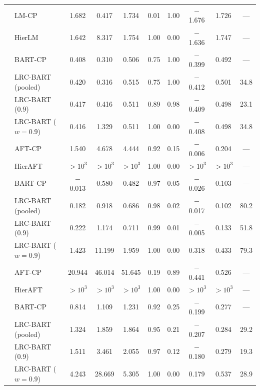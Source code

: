 \documentclass[11pt]{article}
\theoremstyle{definition}
\theoremstyle{plain}
\begin{document}
\begin{longtable}{llcccccccc}
\midrule
{} & LM-CP & 1.682 & 0.417 & 1.734 & 0.01 & 1.00 & $-$1.676 & 1.726 & --- \\*
& HierLM & 1.642 & 8.317 & 1.754 & 1.00 & 0.00 & $-$1.636 & 1.747 & --- \\*
& BART-CP & 0.408 & 0.310 & 0.506 & 0.75 & 1.00 & $-$0.399 & 0.492 & --- \\*
& LRC-BART (pooled) & 0.420 & 0.316 & 0.515 & 0.75 & 1.00 & $-$0.412 & 0.501 & 34.8 \\*
& LRC-BART (0.9) & 0.417 & 0.416 & 0.511 & 0.89 & 0.98 & $-$0.409 & 0.498 & 23.1 \\*
& LRC-BART ($w=0.9$) & 0.416 & 1.329 & 0.511 & 1.00 & 0.00 & $-$0.408 & 0.498 & 34.8 \\
\midrule
{} & AFT-CP & 1.540 & 4.678 & 4.444 & 0.92 & 0.15 & $-$0.006 & 0.204 & --- \\*
& HierAFT & $>\!10^{3}$ & $>\!10^{3}$ & $>\!10^{3}$ & 1.00 & 0.00 & $>\!10^{3}$ & $>\!10^{3}$ & --- \\*
& BART-CP & $-$0.013 & 0.580 & 0.482 & 0.97 & 0.05 & $-$0.026 & 0.103 & --- \\*
& LRC-BART (pooled) & 0.182 & 0.918 & 0.686 & 0.98 & 0.02 & $-$0.017 & 0.102 & 80.2 \\*
& LRC-BART (0.9) & 0.222 & 1.174 & 0.711 & 0.99 & 0.01 & $-$0.005 & 0.133 & 51.8 \\*
& LRC-BART ($w=0.9$) & 1.423 & 11.199 & 1.959 & 1.00 & 0.00 & 0.318 & 0.433 & 79.3 \\
\midrule
{} & AFT-CP & 20.944 & 46.014 & 51.645 & 0.19 & 0.89 & $-$0.441 & 0.526 & --- \\*
& HierAFT & $>\!10^{3}$ & $>\!10^{3}$ & $>\!10^{3}$ & 1.00 & 0.00 & $>\!10^{3}$ & $>\!10^{3}$ & --- \\*
& BART-CP & 0.814 & 1.109 & 1.231 & 0.92 & 0.25 & $-$0.199 & 0.277 & --- \\*
& LRC-BART (pooled) & 1.324 & 1.859 & 1.864 & 0.95 & 0.21 & $-$0.207 & 0.284 & 29.2 \\*
& LRC-BART (0.9) & 1.511 & 3.461 & 2.055 & 0.97 & 0.12 & $-$0.180 & 0.279 & 19.3 \\*
& LRC-BART ($w=0.9$) & 4.243 & 28.669 & 5.305 & 1.00 & 0.00 & 0.179 & 0.537 & 28.9 \\

\end{longtable}
\end{document}
